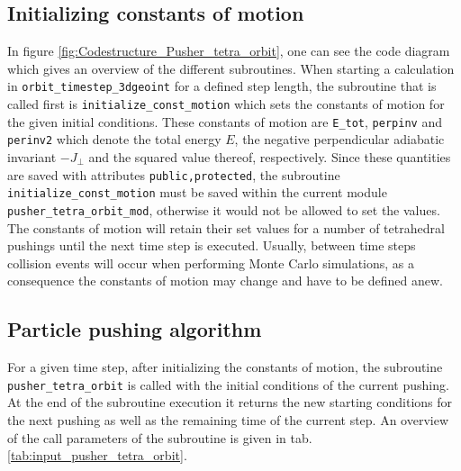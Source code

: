 \documentclass[./main.tex]{subfiles}
\begin{document}
\subsection{Initializing constants of motion}
In figure \ref{fig:Codestructure_Pusher_tetra_orbit}, one can see the code diagram which gives an overview of the different subroutines. When starting a calculation in \texttt{orbit\_timestep\_3dgeoint} for a defined step length, the subroutine that is called first is \texttt{initialize\_const\_motion} which sets the constants of motion for the given initial conditions. These constants of motion are \texttt{E\_tot}, \texttt{perpinv} and \texttt{perinv2} which denote the total energy $E$, the negative perpendicular adiabatic invariant $-J_\perp$ and the squared value thereof, respectively. Since these quantities are saved with attributes \texttt{public,protected}, the subroutine \texttt{initialize\_const\_motion} must be saved within the current module \texttt{pusher\_tetra\_orbit\_mod}, otherwise it would not be allowed to set the values. The constants of motion will retain their set values for a number of tetrahedral pushings until the next time step is executed. Usually, between time steps collision events will occur when performing Monte Carlo simulations, as a consequence the constants of motion may change and have to be defined anew.


\subsection{Particle pushing algorithm}
For a given time step, after initializing the constants of motion, the subroutine \texttt{pusher\_tetra\_orbit} is called with the initial conditions of the current pushing. At the end of the subroutine execution it returns the new starting conditions for the next pushing as well as the remaining time of the current step. An overview of the call parameters of the subroutine is given in tab. \ref{tab:input_pusher_tetra_orbit}.
\end{document}
